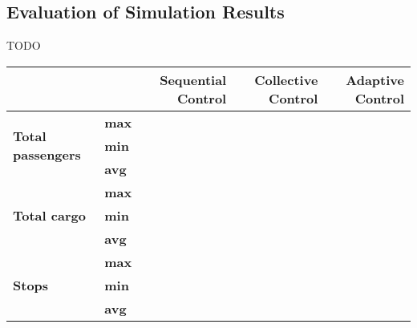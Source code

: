 \subsection{Evaluation of Simulation Results}
TODO

\begin{table}[]
\centering
\begin{tabular}{llrrr}
                                      &     & \begin{minipage}{2cm}\textbf{Sequential Control} \vspace{1em}\end{minipage} & \begin{minipage}{2cm}\textbf{Collective Control} \vspace{1em}\end{minipage} & \begin{minipage}{2cm}\textbf{Adaptive Control} \vspace{1em}\end{minipage}\\
\hline
\multirow{3}{*}{\textbf{Total passengers}}     & \textbf{max} &                   &                    &                  \\
                                               & \textbf{min} &                   &                    &                  \\
                                               & \textbf{avg} &                   &                    &                  \\
\hline                                               
\multirow{3}{*}{\textbf{Total cargo}}          & \textbf{max} &                   &                    &                  \\
                                               & \textbf{min} &                   &                    &                  \\
                                               & \textbf{avg} &                   &                    &                  \\
\hline                                               
\multirow{3}{*}{\textbf{Stops}}                & \textbf{max} &                   &                    &                  \\
                                               & \textbf{min} &                   &                    &                  \\
                                               & \textbf{avg} &                   &                    &                  \\

\end{tabular}
\end{table}
